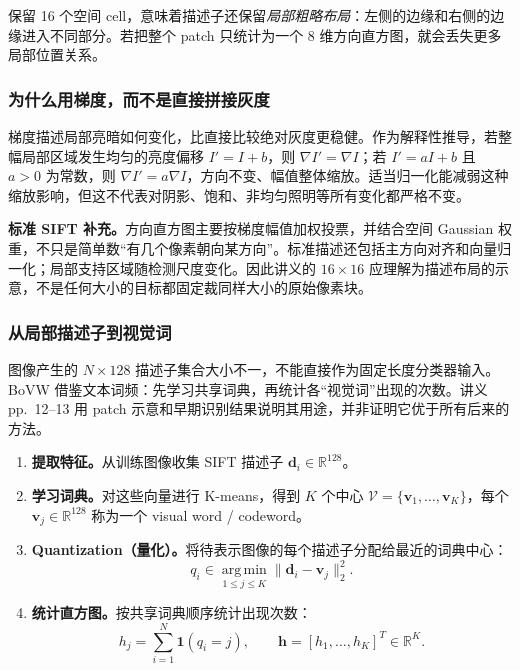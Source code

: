 保留 16 个空间 cell，意味着描述子还保留\emph{局部粗略布局}：左侧的边缘和右侧的边缘进入不同部分。若把整个 patch 只统计为一个 8 维方向直方图，就会丢失更多局部位置关系。

\subsubsection*{为什么用梯度，而不是直接拼接灰度}

梯度描述局部亮暗如何变化，比直接比较绝对灰度更稳健。作为解释性推导，若整幅局部区域发生均匀的亮度偏移 $I'=I+b$，则 $\nabla I'=\nabla I$；若 $I'=aI+b$ 且 $a>0$ 为常数，则 $\nabla I'=a\nabla I$，方向不变、幅值整体缩放。适当归一化能减弱这种缩放影响，但这不代表对阴影、饱和、非均匀照明等所有变化都严格不变。

\textbf{标准 SIFT 补充。}方向直方图主要按梯度幅值加权投票，并结合空间 Gaussian 权重，不只是简单数“有几个像素朝向某方向”。标准描述还包括主方向对齐和向量归一化；局部支持区域随检测尺度变化。因此讲义的 $16\times16$ 应理解为描述布局的示意，不是任何大小的目标都固定裁同样大小的原始像素块。


\subsubsection*{从局部描述子到视觉词}

图像产生的 $N\times128$ 描述子集合大小不一，不能直接作为固定长度分类器输入。BoVW 借鉴文本词频：先学习共享词典，再统计各“视觉词”出现的次数。讲义 pp.~12--13 用 patch 示意和早期识别结果说明其用途，并非证明它优于所有后来的方法。

\begin{enumerate}
  \item \textbf{提取特征。}从训练图像收集 SIFT 描述子 $\bm d_i\in\mathbb R^{128}$。
  \item \textbf{学习词典。}对这些向量进行 K-means，得到 $K$ 个中心
  $\mathcal V=\{\bm v_1,\ldots,\bm v_K\}$，每个 $\bm v_j\in\mathbb R^{128}$ 称为一个 visual word / codeword。
  \item \textbf{Quantization（量化）。}将待表示图像的每个描述子分配给最近的词典中心：
  \[
    q_i\in\operatorname*{arg\,min}_{1\le j\le K}\|\bm d_i-\bm v_j\|_2^2.
  \]
  \item \textbf{统计直方图。}按共享词典顺序统计出现次数：
  \[
    \boxed{h_j=\sum_{i=1}^{N}\mathbf1(q_i=j),\qquad
    \bm h=[h_1,\ldots,h_K]^T\in\mathbb R^K}.
  \]
\end{enumerate}

